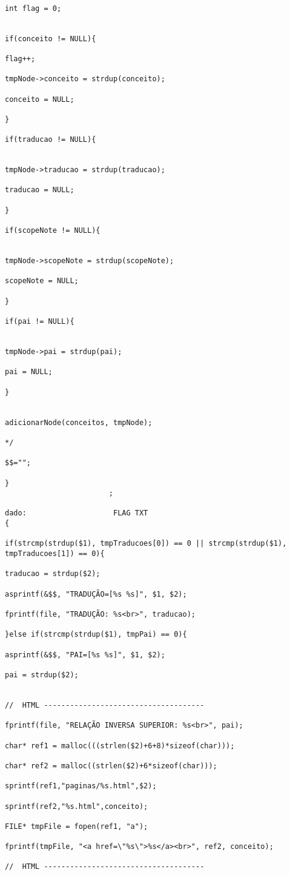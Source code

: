\documentclass[11pt,a4paper]{report}%
\begin{document}
\begin{verbatim}
																				int flag = 0;

																				if(conceito != NULL){
																					flag++;
																					tmpNode->conceito = strdup(conceito);
																					conceito = NULL;
																				}
																				if(traducao != NULL){
																					
																					tmpNode->traducao = strdup(traducao);
																					traducao = NULL;
																				}
																				if(scopeNote != NULL){
																					
																					tmpNode->scopeNote = strdup(scopeNote);
																					scopeNote = NULL;
																				}
																				if(pai != NULL){
																					
																					tmpNode->pai = strdup(pai);
																					pai = NULL;
																				}

																				adicionarNode(conceitos, tmpNode);
																				*/
																				$$="";
																			}
						;

dado:					 FLAG TXT											{
																				if(strcmp(strdup($1), tmpTraducoes[0]) == 0 || strcmp(strdup($1), tmpTraducoes[1]) == 0){
																					traducao = strdup($2);
																					asprintf(&$$, "TRADUÇÃO=[%s %s]", $1, $2);
																					fprintf(file, "TRADUÇÃO: %s<br>", traducao);
																				}else if(strcmp(strdup($1), tmpPai) == 0){
																					asprintf(&$$, "PAI=[%s %s]", $1, $2);
																					pai = strdup($2);
																					
																					//	HTML -------------------------------------
																					fprintf(file, "RELAÇÃO INVERSA SUPERIOR: %s<br>", pai);
																					char* ref1 = malloc(((strlen($2)+6+8)*sizeof(char)));
																					char* ref2 = malloc((strlen($2)+6*sizeof(char)));
                                                									sprintf(ref1,"paginas/%s.html",$2);
                                                									sprintf(ref2,"%s.html",conceito);
																					FILE* tmpFile = fopen(ref1, "a");
																					fprintf(tmpFile, "<a href=\"%s\">%s</a><br>", ref2, conceito);
																					//	HTML -------------------------------------
																				

\end{verbatim}
\end{document}

